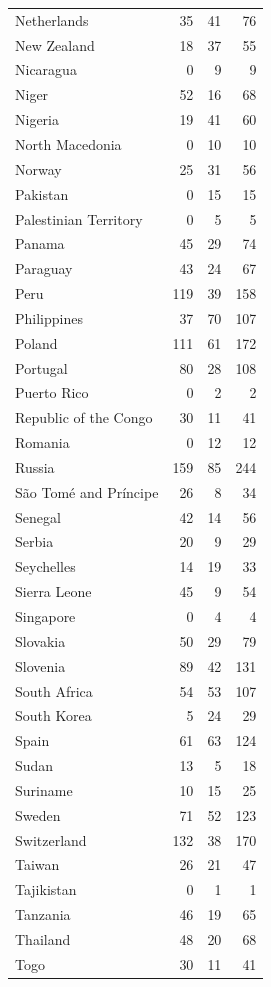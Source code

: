 \documentclass{article} %
\begin{document}
\begin{longtable}{l r r r}
Netherlands & 35 & 41 & 76 \\
New Zealand & 18 & 37 & 55 \\
Nicaragua & 0 & 9 & 9 \\
Niger & 52 & 16 & 68 \\
Nigeria & 19 & 41 & 60 \\
North Macedonia & 0 & 10 & 10 \\
Norway & 25 & 31 & 56 \\
Pakistan & 0 & 15 & 15 \\
Palestinian Territory & 0 & 5 & 5 \\
Panama & 45 & 29 & 74 \\
Paraguay & 43 & 24 & 67 \\
Peru & 119 & 39 & 158 \\
Philippines & 37 & 70 & 107 \\
Poland & 111 & 61 & 172 \\
Portugal & 80 & 28 & 108 \\
Puerto Rico & 0 & 2 & 2 \\
Republic of the Congo & 30 & 11 & 41 \\
Romania & 0 & 12 & 12 \\
Russia & 159 & 85 & 244 \\
São Tomé and Príncipe & 26 & 8 & 34 \\
Senegal & 42 & 14 & 56 \\
Serbia & 20 & 9 & 29 \\
Seychelles & 14 & 19 & 33 \\
Sierra Leone & 45 & 9 & 54 \\
Singapore & 0 & 4 & 4 \\
Slovakia & 50 & 29 & 79 \\
Slovenia & 89 & 42 & 131 \\
South Africa & 54 & 53 & 107 \\
South Korea & 5 & 24 & 29 \\
Spain & 61 & 63 & 124 \\
Sudan & 13 & 5 & 18 \\
Suriname & 10 & 15 & 25 \\
Sweden & 71 & 52 & 123 \\
Switzerland & 132 & 38 & 170 \\
Taiwan & 26 & 21 & 47 \\
Tajikistan & 0 & 1 & 1 \\
Tanzania & 46 & 19 & 65 \\
Thailand & 48 & 20 & 68 \\
Togo & 30 & 11 & 41 \\

\end{longtable}
\end{document}
